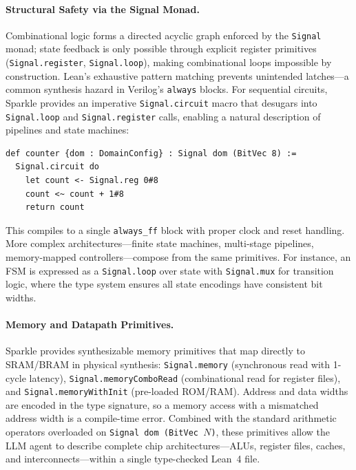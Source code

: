 \paragraph{Structural Safety via the Signal Monad.}
Combinational logic forms a directed acyclic graph enforced by the \texttt{Signal} monad; state feedback is only possible through explicit register primitives (\texttt{Signal.register}, \texttt{Signal.loop}), making combinational loops impossible by construction. Lean's exhaustive pattern matching prevents unintended latches---a common synthesis hazard in Verilog's \texttt{always} blocks. For sequential circuits, Sparkle provides an imperative \texttt{Signal.circuit} macro that desugars into \texttt{Signal.loop} and \texttt{Signal.register} calls, enabling a natural description of pipelines and state machines:
\begin{small}
\begin{verbatim}
def counter {dom : DomainConfig} : Signal dom (BitVec 8) :=
  Signal.circuit do
    let count <- Signal.reg 0#8
    count <~ count + 1#8
    return count
\end{verbatim}
\end{small}
This compiles to a single \texttt{always\_ff} block with proper clock and reset handling. More complex architectures---finite state machines, multi-stage pipelines, memory-mapped controllers---compose from the same primitives. For instance, an FSM is expressed as a \texttt{Signal.loop} over state with \texttt{Signal.mux} for transition logic, where the type system ensures all state encodings have consistent bit widths.

\paragraph{Memory and Datapath Primitives.}
Sparkle provides synthesizable memory primitives that map directly to SRAM/BRAM in physical synthesis: \texttt{Signal.memory} (synchronous read with 1-cycle latency), \texttt{Signal.memoryComboRead} (combinational read for register files), and \texttt{Signal.memoryWithInit} (pre-loaded ROM/RAM). Address and data widths are encoded in the type signature, so a memory access with a mismatched address width is a compile-time error. Combined with the standard arithmetic operators overloaded on \texttt{Signal dom (BitVec $N$)}, these primitives allow the LLM agent to describe complete chip architectures---ALUs, register files, caches, and interconnects---within a single type-checked Lean~4 file.

